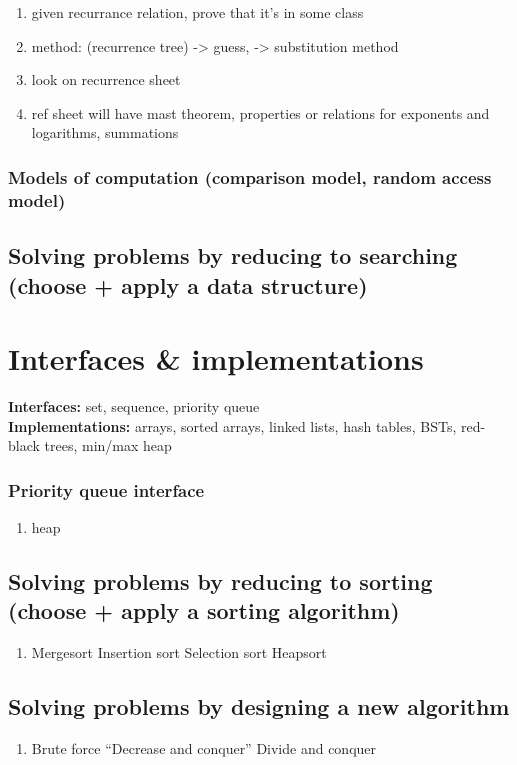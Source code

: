 \documentclass{article}
\begin{document}
        \begin{enumerate}
            \item given recurrance relation, prove that it's in some class
            \item method: (recurrence tree) -> guess, -> substitution method
            \item look on recurrence sheet 
            \item ref sheet will have mast theorem, properties or relations for exponents and logarithms, summations
        \end{enumerate}
        \subsubsection{Models of computation (comparison model, random access model)}
    \subsection{Solving problems by reducing to searching (choose + apply a data structure)
}


\section{Interfaces \& implementations}

    \textbf{Interfaces:} set, sequence, priority queue\\
    \textbf{Implementations:} arrays, sorted arrays, linked lists, hash tables, BSTs, red-black trees, min/max heap

\subsubsection{Priority queue interface}
\begin{enumerate}
    \item heap
\end{enumerate}
\subsection{Solving problems by reducing to sorting (choose + apply a sorting algorithm)}
\begin{enumerate}
    \item Mergesort
    Insertion sort
    Selection sort
    Heapsort
    
\end{enumerate}
\subsection{Solving problems by designing a new algorithm}
\begin{enumerate}
    \item Brute force
    “Decrease and conquer”
    Divide and conquer
\end{enumerate}
\end{document}
